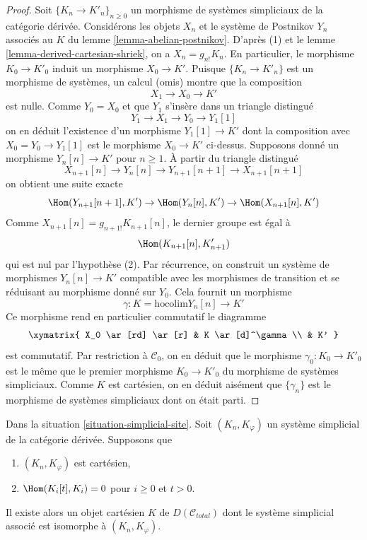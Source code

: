\begin{proof}
Soit $\{K_n \to K'_n\}_{n \geq 0}$
un morphisme de systèmes simpliciaux de la catégorie dérivée.
Considérons les objets $X_n$ et le système de Postnikov $Y_n$
associés au $K$ du lemme \ref{lemma-abelian-postnikov}.
D'après (1) et le lemme \ref{lemma-derived-cartesian-shriek}, on a
$X_n = g_{n!}K_n$. En particulier, le morphisme $K_0 \to K'_0$
induit un morphisme $X_0 \to K'$. Puisque $\{K_n \to K'_n\}$
est un morphisme de systèmes, un calcul (omis) montre que
la composition
$$
X_1 \to X_0 \to K'
$$
est nulle. Comme $Y_0 = X_0$ et que $Y_1$ s'insère dans un
triangle distingué
$$
Y_1 \to X_1 \to Y_0 \to Y_1[1]
$$
on en déduit l'existence d'un morphisme $Y_1[1] \to K'$ dont la composition
avec $X_0 = Y_0 \to Y_1[1]$ est le morphisme $X_0 \to K'$
ci-dessus. Supposons donné un morphisme $Y_n[n] \to K'$ pour $n \geq 1$.
À partir du triangle distingué
$$
X_{n + 1}[n] \to Y_n[n] \to Y_{n + 1}[n + 1] \to X_{n + 1}[n + 1]
$$
on obtient une suite exacte
$$
\Hom(Y_{n + 1}[n + 1], K') \to
\Hom(Y_n[n], K') \to
\Hom(X_{n + 1}[n], K')
$$
Comme $X_{n + 1}[n] = g_{n + 1!}K_{n + 1}[n]$, le dernier groupe est égal à
$$
\Hom(K_{n + 1}[n], K'_{n + 1})
$$
qui est nul par l'hypothèse (2). Par récurrence, on construit un système de morphismes
$Y_n[n] \to K'$ compatible avec les morphismes de transition et se réduisant
au morphisme donné sur $Y_0$. Cela fournit un morphisme
$$
\gamma :
K = \text{hocolim} Y_n[n]
\longrightarrow
K'
$$
Ce morphisme rend en particulier commutatif le diagramme
$$
\xymatrix{
X_0 \ar[rd] \ar[r] &
K \ar[d]^\gamma \\
& K'
}
$$
est commutatif. Par restriction à
$\mathcal{C}_0$, on en déduit que le morphisme $\gamma_0 : K_0 \to K'_0$
est le même que le premier morphisme $K_0 \to K'_0$ du morphisme
de systèmes simpliciaux. Comme $K$ est cartésien, on en déduit aisément que
$\{\gamma_n\}$ est le morphisme de systèmes simpliciaux dont on était parti.
\end{proof}

\begin{lemma}
\label{lemma-cartesian-object-derived-from-simplicial}
Dans la situation \ref{situation-simplicial-site}. Soit
$(K_n, K_\varphi)$ un système simplicial de la catégorie dérivée.
Supposons que
\begin{enumerate}
\item $(K_n, K_\varphi)$ est cartésien,
\item $\Hom(K_i[t], K_i) = 0$ pour $i \geq 0$ et $t > 0$.
\end{enumerate}
Il existe alors un objet cartésien $K$ de $D(\mathcal{C}_{total})$
dont le système simplicial associé est isomorphe à $(K_n, K_\varphi)$.
\end{lemma}

